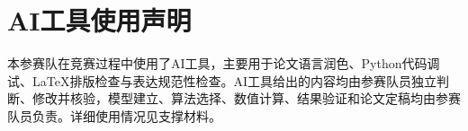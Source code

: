 \section*{AI工具使用声明}

本参赛队在竞赛过程中使用了AI工具，主要用于论文语言润色、Python代码调试、\LaTeX{}排版检查与表达规范性检查。AI工具给出的内容均由参赛队员独立判断、修改并核验，模型建立、算法选择、数值计算、结果验证和论文定稿均由参赛队员负责。详细使用情况见支撑材料。

